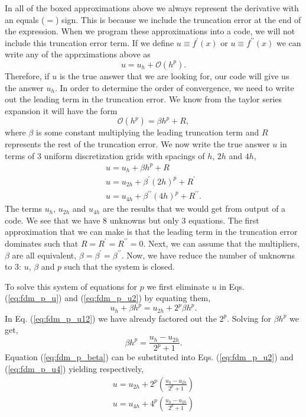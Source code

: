 In all of the boxed approximations above we always represent the derivative with an equals ($=$) sign. This is because we include the truncation error at the end of the expression. When we program these approximations into a code, we will not include
this truncation error term.  If we define $u\equiv f^{\prime}\left(x\right)$ or $u \equiv f^{\prime\prime}\left(x\right)$ we can 
write any of the apprximations above as
\begin{equation}
     u = u_{h}+ \mathcal{O}\left(h^{p}\right).
\end{equation}
Therefore, if $u$ is the true answer that we are looking for, our code will give us the answer $u_{h}$.  In order to determine
the order of convergence, we need to write out the leading term in the truncation error. We know from the taylor series 
expansion it will have the form
\begin{equation}
     \mathcal{O}\left(h^{p}\right) = \beta h^{p} + R,
\end{equation}
where $\beta$ is some constant multiplying the leading truncation term and $R$ represents the rest of the truncation error.
We now write the true answer $u$ in terms of 3 uniform discretization grids with spacings of $h$, $2h$ and $4h$,
\begin{eqnarray}
     u = u_{h} + \beta h^{p} + R 
   \label{eq:fdm_p_u} \\ 
     u = u_{2h} + \beta^{\prime}\left(2h\right)^{p} + R^{\prime}
  \label{eq:fdm_p_u2} \\
     u = u_{4h} + \beta^{\prime\prime}\left(4h\right)^{p} + R^{\prime\prime}.
  \label{eq:fdm_p_u4}
\end{eqnarray}
The terms $u_{h}$, $u_{2h}$ and $u_{4h}$ are the results that we would get from output of a code.  We see that we
have 8 unknowns but only 3 equations.  The first approximation that we can make is that the leading term in the truncation
error dominates such that $R=R^{\prime}=R^{\prime\prime}=0$. Next, we can assume that the multipliers, $\beta$ are 
all equivalent, $\beta=\beta^{\prime}=\beta^{\prime\prime}$.  Now, we have reduce the number of unknowns to 3: 
$u$, $\beta$ and $p$ such that the system is closed.

To solve this system of equations for $p$ we first eliminate $u$ in Eqs. (\ref{eq:fdm_p_u}) and (\ref{eq:fdm_p_u2}) by
equating them,
\begin{equation}
     u_{h} + \beta h^{p} =  u_{2h} + 2^{p}\beta h^{p}.
  \label{eq:fdm_p_u12}
\end{equation}
In Eq. (\ref{eq:fdm_p_u12}) we have already factored out the $2^{p}$.  Solving for $\beta h^{p}$ we get,
\begin{equation}
     \beta h^{p} = \frac{u_{h} - u_{2h}}{2^{p} + 1}.
     \label{eq:fdm_p_beta}
\end{equation}
Equation (\ref{eq:fdm_p_beta}) can be substituted into Eqs. (\ref{eq:fdm_p_u2}) and (\ref{eq:fdm_p_u4}) yielding
respectively,
\begin{eqnarray}
     u = u_{2h} + 2^{p}\left( \frac{u_{h} - u_{2h}}{2^{p} + 1}\right) \\
    u = u_{4h} + 4^{p}\left( \frac{u_{h} - u_{2h}}{2^{p} + 1}\right)
\end{eqnarray}

